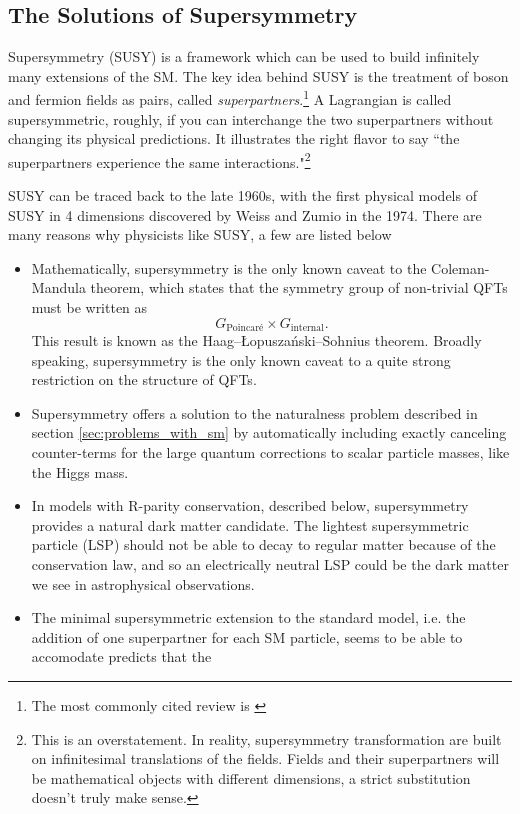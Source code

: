   \subsection{The Solutions of Supersymmetry}
    Supersymmetry (SUSY) is a framework which can be used to build infinitely many extensions of the SM. The key idea behind SUSY is the treatment of boson and fermion fields as pairs, called \emph{superpartners}.\footnote{The most commonly cited review is \cite{susy_primer}} A Lagrangian is called supersymmetric, roughly, if you can interchange the two superpartners without changing its physical predictions. It illustrates the right flavor to say ``the superpartners experience the same interactions."\footnote{This is an overstatement. In reality, supersymmetry transformation are built on infinitesimal translations of the fields. Fields and their superpartners will be mathematical objects with different dimensions, a strict substitution doesn't truly make sense. }

    SUSY can be traced back to the late 1960s, with the first physical models of SUSY in 4 dimensions discovered by Weiss and Zumio in the 1974. \cite[ch. 24]{weinberg_SUSY} There are many reasons why physicists like SUSY, a few are listed below

    \begin{itemize}
    \item Mathematically, supersymmetry is the only known caveat to the Coleman-Mandula theorem, which states that the symmetry group of non-trivial QFTs must be written as
      \[
      G_{\text{Poincaré}} \times G_{\text{internal}}.
      \]
      This result is known as the Haag–Łopuszański–Sohnius theorem. Broadly speaking, supersymmetry is the only known caveat to a quite strong restriction on the structure of QFTs.
    \item Supersymmetry offers a solution to the naturalness problem described in section \ref{sec:problems_with_sm} by automatically including exactly canceling counter-terms for the large quantum corrections to scalar particle masses, like the Higgs mass.
    \item In models with R-parity conservation, described below, supersymmetry provides a natural dark matter candidate. The lightest supersymmetric particle (LSP) should not be able to decay to regular matter because of the conservation law, and so an electrically neutral LSP could be the dark matter we see in astrophysical observations.
    \item The minimal supersymmetric extension to the standard model, i.e. the addition of one superpartner for each SM particle, seems to be able to accomodate predicts that the
    \end{itemize}

